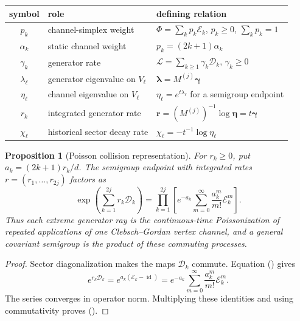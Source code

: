 \documentclass[twoside,10pt]{article}
\numberwithin{equation}{section}
\theoremstyle{slbody}
\newtheorem{proposition}[theorem]{Proposition}
\theoremstyle{definition}
\theoremstyle{remark}
\newcommand{\id}{\operatorname{id}}
\newcommand{\cL}{\mathcal L}
\newcommand{\cD}{\mathcal D}
\newcommand{\cE}{\mathcal E}
\renewcommand{\eqref}[1]{%
  \textup{{\normalfont(\oldstylenums{\ref{#1}}}\normalfont)}}
\begin{document}
\begin{center}
\begin{minipage}{\textwidth}
\centering\small
\begin{tabular}{c p{1.55in} p{3.05in}}
\hline
symbol & role & defining relation \\ \hline
\(p_k\) & channel-simplex weight
  & \(\Phi=\sum_kp_k\cE_k\), \(p_k\geq0\), \(\sum_kp_k=1\) \\
\(\alpha_k\) & static channel weight
  & \(p_k=(2k+1)\alpha_k\)
    \cite[Eqs.~(26)--(31)]{RudnickiKlimovMunozLeuchsSanchezSoto2026} \\
\(\gamma_k\) & generator rate
  & \(\cL=\sum_{k\geq1}\gamma_k\cD_k\), \(\gamma_k\geq0\) \\
\(\lambda_\ell\) & generator eigenvalue on \(V_\ell\)
  & \(\bm\lambda=M^{(j)}\bm\gamma\) \\
\(\eta_\ell\) & channel eigenvalue on \(V_\ell\)
  & \(\eta_\ell=e^{t\lambda_\ell}\) for a semigroup endpoint \\
\(r_k\) & integrated generator rate
  & \(\bm r=(M^{(j)})^{-1}\log\bm\eta=t\bm\gamma\) \\
\(\chi_\ell\) & historical sector decay rate
  & \(\chi_\ell=-t^{-1}\log\eta_\ell\) \\ \hline
\end{tabular}
\captionsetup{hypcap=false}
\label{tab:notation-dictionary}
\end{minipage}
\end{center}

\begin{proposition}[Poisson collision representation]
\label{prop:poisson-collision}
For \(r_k\geq0\), put \(a_k=(2k+1)r_k/d\).  The semigroup endpoint
with integrated rates \(r=(r_1,\ldots,r_{2j})\) factors as
\begin{equation}\label{eq:poisson-factorization}
 \exp\left(\sum_{k=1}^{2j}r_k\cD_k\right)
 =\prod_{k=1}^{2j}
 \left[
 e^{-a_k}\sum_{m=0}^{\infty}\frac{a_k^m}{m!}\cE_k^m
 \right].
\end{equation}
Thus each extreme generator ray is the continuous-time Poissonization
of repeated applications of one Clebsch--Gordan vertex channel, and a
general covariant semigroup is the product of these commuting
processes.
\end{proposition}

\begin{proof}
Sector diagonalization makes the maps \(\cD_k\) commute.  Equation
\eqref{eq:dissipator-vertex} gives
\begin{equation*}
 e^{r_k\cD_k}
 =e^{a_k(\cE_k-\id)}
 =e^{-a_k}\sum_{m=0}^\infty\frac{a_k^m}{m!}\cE_k^m.
\end{equation*}
The series converges in operator norm.  Multiplying these identities
and using commutativity proves \eqref{eq:poisson-factorization}.
\end{proof}
\end{document}
